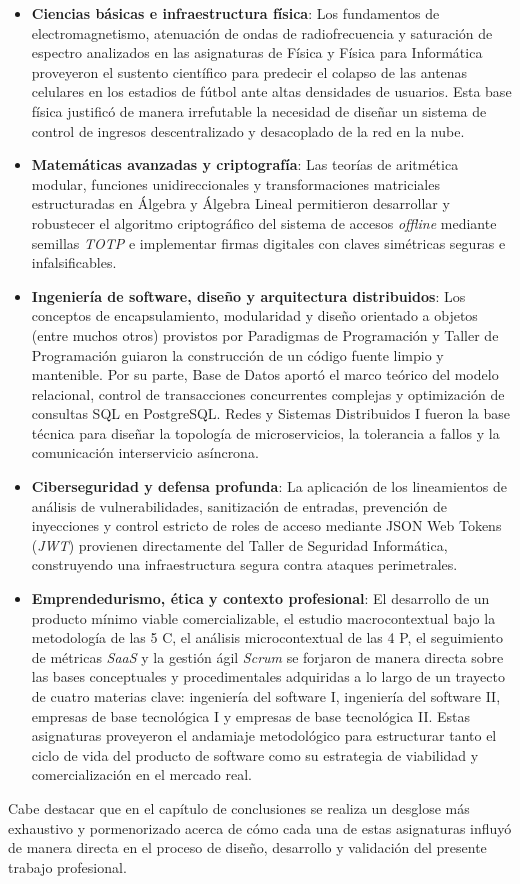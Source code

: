 \begin{itemize}
    \item \textbf{Ciencias básicas e infraestructura física}: Los fundamentos de electromagnetismo, atenuación de ondas de radiofrecuencia y saturación de espectro analizados en las asignaturas de Física y Física para Informática proveyeron el sustento científico para predecir el colapso de las antenas celulares en los estadios de fútbol ante altas densidades de usuarios. Esta base física justificó de manera irrefutable la necesidad de diseñar un sistema de control de ingresos descentralizado y desacoplado de la red en la nube.
    \item \textbf{Matemáticas avanzadas y criptografía}: Las teorías de aritmética modular, funciones unidireccionales y transformaciones matriciales estructuradas en Álgebra y Álgebra Lineal permitieron desarrollar y robustecer el algoritmo criptográfico del sistema de accesos \textit{offline} mediante semillas \textit{TOTP} e implementar firmas digitales con claves simétricas seguras e infalsificables.
    \item \textbf{Ingeniería de software, diseño y arquitectura distribuidos}: Los conceptos de encapsulamiento, modularidad y diseño orientado a objetos (entre muchos otros) provistos por Paradigmas de Programación y Taller de Programación guiaron la construcción de un código fuente limpio y mantenible. Por su parte, Base de Datos aportó el marco teórico del modelo relacional, control de transacciones concurrentes complejas y optimización de consultas SQL en PostgreSQL. Redes y Sistemas Distribuidos I fueron la base técnica para diseñar la topología de microservicios, la tolerancia a fallos y la comunicación interservicio asíncrona.
    \item \textbf{Ciberseguridad y defensa profunda}: La aplicación de los lineamientos de análisis de vulnerabilidades, sanitización de entradas, prevención de inyecciones y control estricto de roles de acceso mediante JSON Web Tokens (\textit{JWT}) provienen directamente del Taller de Seguridad Informática, construyendo una infraestructura segura contra ataques perimetrales.
    \item \textbf{Emprendedurismo, ética y contexto profesional}: El desarrollo de un producto mínimo viable comercializable, el estudio macrocontextual bajo la metodología de las 5 C, el análisis microcontextual de las 4 P, el seguimiento de métricas \textit{SaaS} y la gestión ágil \textit{Scrum} se forjaron de manera directa sobre las bases conceptuales y procedimentales adquiridas a lo largo de un trayecto de cuatro materias clave: ingeniería del software I, ingeniería del software II, empresas de base tecnológica I y empresas de base tecnológica II. Estas asignaturas proveyeron el andamiaje metodológico para estructurar tanto el ciclo de vida del producto de software como su estrategia de viabilidad y comercialización en el mercado real.
\end{itemize}

Cabe destacar que en el capítulo de conclusiones se realiza un desglose más exhaustivo y pormenorizado acerca de cómo cada una de estas asignaturas influyó de manera directa en el proceso de diseño, desarrollo y validación del presente trabajo profesional.
